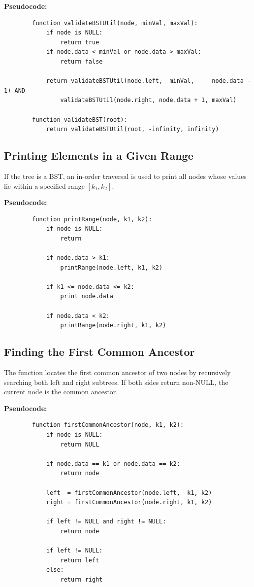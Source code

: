 \documentclass[11pt]{article}
\begin{document}
	\textbf{Pseudocode:}
	\begin{verbatim}
		function validateBSTUtil(node, minVal, maxVal):
			if node is NULL:
				return true
			if node.data < minVal or node.data > maxVal:
				return false
			
			return validateBSTUtil(node.left,  minVal,     node.data - 1) AND
				validateBSTUtil(node.right, node.data + 1, maxVal)
		
		function validateBST(root):
			return validateBSTUtil(root, -infinity, infinity)
	\end{verbatim}
	
	\subsection{Printing Elements in a Given Range}
	If the tree is a BST, an in-order traversal is used to print all nodes whose values lie within a specified range \([k_1, k_2]\).
	
	\textbf{Pseudocode:}
	\begin{verbatim}
		function printRange(node, k1, k2):
			if node is NULL:
				return
		
			if node.data > k1:
				printRange(node.left, k1, k2)
		
			if k1 <= node.data <= k2:
				print node.data
		
			if node.data < k2:
				printRange(node.right, k1, k2)
	\end{verbatim}
	
	\subsection{Finding the First Common Ancestor}
	The function locates the first common ancestor of two nodes by recursively searching both left and right subtrees. If both sides return non-NULL, the current node is the common ancestor.
	
	\textbf{Pseudocode:}
	\begin{verbatim}
		function firstCommonAncestor(node, k1, k2):
			if node is NULL:
				return NULL
			
			if node.data == k1 or node.data == k2:
				return node
			
			left  = firstCommonAncestor(node.left,  k1, k2)
			right = firstCommonAncestor(node.right, k1, k2)
			
			if left != NULL and right != NULL:
				return node
			
			if left != NULL:
				return left
			else:
				return right
	\end{verbatim}
	
\end{document}
